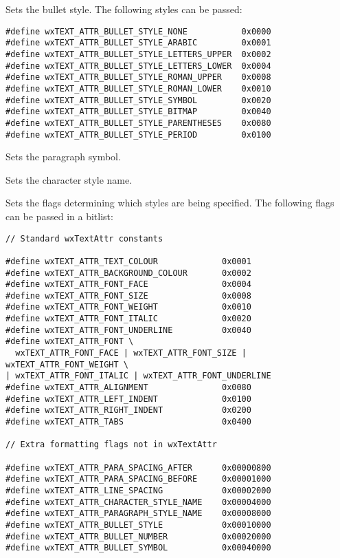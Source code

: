 
Sets the bullet style. The following styles can be passed:

{\small
\begin{verbatim}
#define wxTEXT_ATTR_BULLET_STYLE_NONE           0x0000
#define wxTEXT_ATTR_BULLET_STYLE_ARABIC         0x0001
#define wxTEXT_ATTR_BULLET_STYLE_LETTERS_UPPER  0x0002
#define wxTEXT_ATTR_BULLET_STYLE_LETTERS_LOWER  0x0004
#define wxTEXT_ATTR_BULLET_STYLE_ROMAN_UPPER    0x0008
#define wxTEXT_ATTR_BULLET_STYLE_ROMAN_LOWER    0x0010
#define wxTEXT_ATTR_BULLET_STYLE_SYMBOL         0x0020
#define wxTEXT_ATTR_BULLET_STYLE_BITMAP         0x0040
#define wxTEXT_ATTR_BULLET_STYLE_PARENTHESES    0x0080
#define wxTEXT_ATTR_BULLET_STYLE_PERIOD         0x0100
\end{verbatim}
}

\label{wxrichtextattrsetbulletsymbol}


Sets the paragraph symbol.

\label{wxrichtextattrsetcharacterstylename}


Sets the character style name.

\label{wxrichtextattrsetflags}


Sets the flags determining which styles are being specified. The following
flags can be passed in a bitlist:

{\small
\begin{verbatim}
// Standard wxTextAttr constants

#define wxTEXT_ATTR_TEXT_COLOUR             0x0001
#define wxTEXT_ATTR_BACKGROUND_COLOUR       0x0002
#define wxTEXT_ATTR_FONT_FACE               0x0004
#define wxTEXT_ATTR_FONT_SIZE               0x0008
#define wxTEXT_ATTR_FONT_WEIGHT             0x0010
#define wxTEXT_ATTR_FONT_ITALIC             0x0020
#define wxTEXT_ATTR_FONT_UNDERLINE          0x0040
#define wxTEXT_ATTR_FONT \
  wxTEXT_ATTR_FONT_FACE | wxTEXT_ATTR_FONT_SIZE | wxTEXT_ATTR_FONT_WEIGHT \
| wxTEXT_ATTR_FONT_ITALIC | wxTEXT_ATTR_FONT_UNDERLINE
#define wxTEXT_ATTR_ALIGNMENT               0x0080
#define wxTEXT_ATTR_LEFT_INDENT             0x0100
#define wxTEXT_ATTR_RIGHT_INDENT            0x0200
#define wxTEXT_ATTR_TABS                    0x0400

// Extra formatting flags not in wxTextAttr

#define wxTEXT_ATTR_PARA_SPACING_AFTER      0x00000800
#define wxTEXT_ATTR_PARA_SPACING_BEFORE     0x00001000
#define wxTEXT_ATTR_LINE_SPACING            0x00002000
#define wxTEXT_ATTR_CHARACTER_STYLE_NAME    0x00004000
#define wxTEXT_ATTR_PARAGRAPH_STYLE_NAME    0x00008000
#define wxTEXT_ATTR_BULLET_STYLE            0x00010000
#define wxTEXT_ATTR_BULLET_NUMBER           0x00020000
#define wxTEXT_ATTR_BULLET_SYMBOL           0x00040000
\end{verbatim}
}

